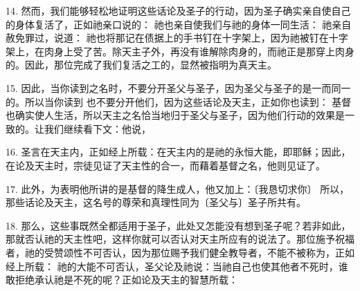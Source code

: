 14. 然而，我们能够轻松地证明这些话论及圣子的行动，因为圣子确实亲自使自己的身体复活了，正如祂亲口说的： 祂也亲自使我们与祂的身体一同生活： 祂亲自赦免罪过，说道： 祂也将那记在债据上的手书钉在十字架上，因为祂被钉在十字架上，在肉身上受了苦。除天主子外，再没有谁解除肉身的，而祂正是那穿上肉身的。因此，那位完成了我们复活之工的，显然被指明为真天主。\par

\par

15. 因此，当你读到之名时，不要分开圣父与圣子，因为圣父与圣子的是一而同一的。所以当你读到 也不要分开他们，因为这些话论及天主，正如你也读到： 基督也确实使人生活，所以天主之名恰当地归于圣父与圣子，因为他们行动的效果是一致的。让我们继续看下文：他说，\par

16. 圣言在天主内，正如经上所载：在天主内的是祂的永恒大能，即耶稣；因此，在论及天主时，宗徒见证了天主性的合一，而藉着基督之名，他则见证了。\par

17. 此外，为表明他所讲的是基督的降生成人，他又加上：〔我恳切求你〕 所以，那些话论及天主，这名号的尊荣和真理性同为〔圣父与〕圣子所共有。\par

18. 那么，这些事既然全都适用于圣子，此处又怎能没有想到圣子呢？若非如此，那就否认祂的天主性吧，这样你就可以否认对天主所应有的说法了。那位施予祝福者，祂的受赞颂性不可否认，因为那位赐予我们健全教导者，不能不被称为，正如经上所载： 祂的大能不可否认，圣父论及祂说：当祂自己也使其他者不死时，谁敢拒绝承认祂是不死的呢？正如论及天主的智慧所载：\par

